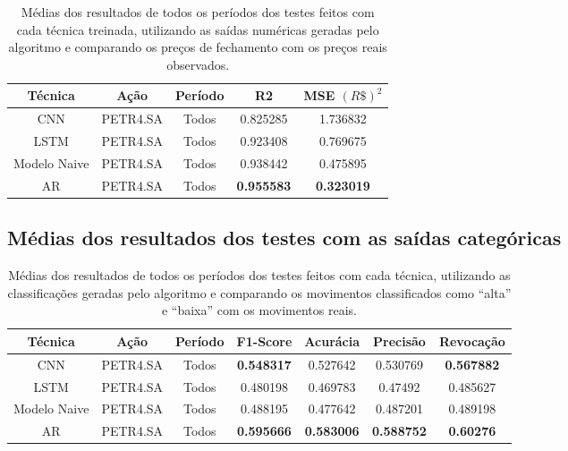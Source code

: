 \begin{table}[H]
\footnotesize
\centering
\caption{Médias dos resultados de todos os períodos dos testes feitos com cada técnica treinada, utilizando as saídas numéricas geradas pelo algoritmo e comparando os preços de fechamento com os preços reais observados.}
\begin{tabular}{ccccc}
\hline
\textbf{Técnica} & \textbf{Ação} & \textbf{Período} & \textbf{R2} & \textbf{MSE $({R\$})^{2}$} \\ \hline
CNN & PETR4.SA & Todos & 0.825285 & 1.736832 \\
LSTM & PETR4.SA & Todos & 0.923408 & 0.769675 \\
Modelo   Naive & PETR4.SA & Todos & 0.938442 & 0.475895 \\
AR & PETR4.SA & Todos & \textbf{0.955583} & \textbf{0.323019} \\ \hline
\end{tabular}
\end{table}


\subsection{\textbf{Médias dos resultados dos testes com as saídas categóricas}}


\begin{table}[htp]
\footnotesize
\centering
\caption{Médias dos resultados de todos os períodos dos testes feitos com cada técnica, utilizando as classificações geradas pelo algoritmo e comparando os movimentos classificados como “alta” e “baixa” com os movimentos reais.}
\begin{tabular}{ccccccc}
\hline
\textbf{Técnica} & \textbf{Ação} & \textbf{Período} & \textbf{F1-Score} & \textbf{Acurácia} & \textbf{Precisão} & \textbf{Revocação} \\ \hline
CNN & PETR4.SA & Todos & \textbf{0.548317} & 0.527642 & 0.530769 & \textbf{0.567882} \\
LSTM & PETR4.SA & Todos & 0.480198 & 0.469783 & 0.47492 & 0.485627 \\
Modelo   Naive & PETR4.SA & Todos & 0.488195 & 0.477642 & 0.487201 & 0.489198 \\
AR & PETR4.SA & Todos & \textbf{0.595666} & \textbf{0.583006} & \textbf{0.588752} & \textbf{0.60276} \\ \hline
\end{tabular}
\end{table}



